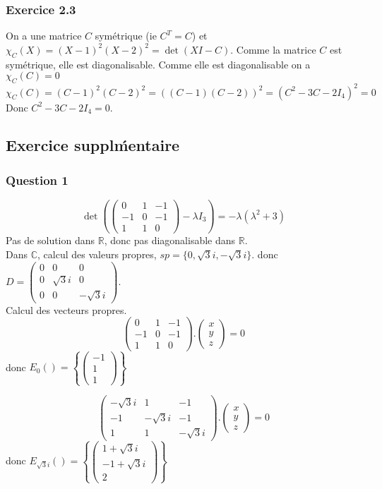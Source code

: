 \documentclass[]{book}
\theoremstyle{definition}
\newcommand{\bb}[1]{\mathbb{#1}}
\newcommand{\R}{\bb{R}}
\newcommand{\C}{\bb{C}}
\begin{document}
\subsubsection*{Exercice 2.3}
On a une matrice $C$ sym\'etrique (ie $C^T = C$) et $\chi_{C}(X) = (X-1)^2(X-2)^2 = \det(XI-C)$. Comme la matrice $C$ est sym\'etrique, elle est diagonalisable. Comme elle est diagonalisable on a $\chi_{C}(C) = 0$
$$\chi_{C}(C) = (C-1)^2(C-2)^2 = ((C-1)(C-2))^2=(C^2-3C-2I_4)^2 = 0$$
Donc $C^2-3C-2I_4 = 0$.


\subsection*{Exercice suppl\'mentaire}
\subsubsection*{Question 1}
$$\det\left(\begin{pmatrix} 0 & 1 & -1 \\-1 & 0 & -1 \\1 & 1 & 0\end{pmatrix} - \lambda I_3\right) = -\lambda(\lambda^2+3)$$
Pas de solution dans $\R$, donc pas diagonalisable dans $\R$.\\
Dans $\C$, calcul des valeurs propres, $sp=\{0, \sqrt{3}i, -\sqrt{3}i\}$. donc $D=\begin{pmatrix} 0 & 0 & 0 \\0 & \sqrt{3}i & 0 \\0 & 0 & -\sqrt{3}i\end{pmatrix}$.\\
Calcul des vecteurs propres.
$$\begin{pmatrix} 0 & 1 & -1 \\-1 & 0 & -1 \\1 & 1 & 0\end{pmatrix} . \begin{pmatrix} x \\ y\\z \end{pmatrix} = 0$$
donc $E_{0}()=\left\{ \begin{pmatrix} -1 \\ 1\\1 \end{pmatrix} \right\}$

$$\begin{pmatrix} -\sqrt{3}i & 1 & -1 \\-1 & -\sqrt{3}i & -1 \\1 & 1 & -\sqrt{3}i\end{pmatrix} . \begin{pmatrix} x \\ y\\z \end{pmatrix} = 0$$
donc $E_{\sqrt{3}i}()=\left\{ \begin{pmatrix} 1+\sqrt{3}i \\ -1+\sqrt{3}i\\2 \end{pmatrix} \right\}$
\end{document}
